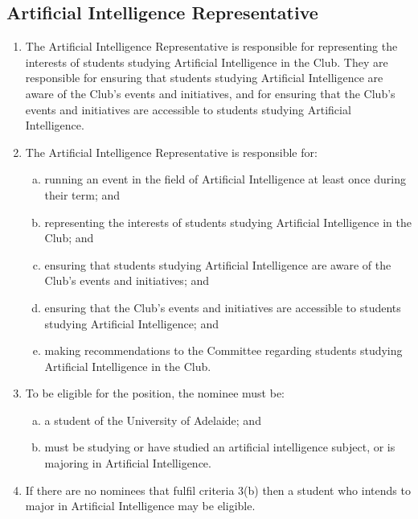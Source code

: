 \documentclass{schedule}
\begin{document}
\subsection{Artificial Intelligence Representative}
\begin{enumerate}[(1)]
    \item The Artificial Intelligence Representative is responsible for representing the interests of students studying Artificial Intelligence in the Club. They are responsible for ensuring that students studying Artificial Intelligence are aware of the Club's events and initiatives, and for ensuring that the Club's events and initiatives are accessible to students studying Artificial Intelligence.
    \item The Artificial Intelligence Representative is responsible for:
          \begin{enumerate}[(a)]
              \item running an event in the field of Artificial Intelligence at least once during their term; and
              \item representing the interests of students studying Artificial Intelligence in the Club; and
              \item ensuring that students studying Artificial Intelligence are aware of the Club's events and initiatives; and
              \item ensuring that the Club's events and initiatives are accessible to students studying Artificial Intelligence; and
              \item making recommendations to the Committee regarding students studying Artificial Intelligence in the Club.
          \end{enumerate}
    \item To be eligible for the position, the nominee must be:
          \begin{enumerate}[(a)]
              \item a student of the University of Adelaide; and
              \item must be studying or have studied an artificial intelligence subject, or is majoring in Artificial Intelligence.
          \end{enumerate}
    \item If there are no nominees that fulfil criteria 3(b) then a student who intends to major in Artificial Intelligence may be eligible.
\end{enumerate}
\end{document}
